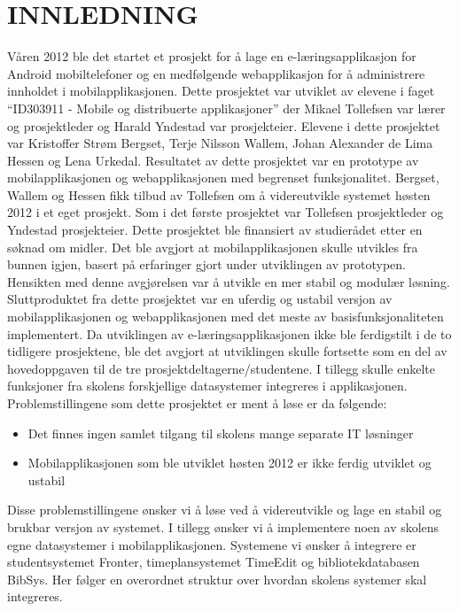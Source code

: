 \documentclass[../main.tex]{subfiles}
\begin{document}
\section{INNLEDNING}

Våren 2012 ble det startet et prosjekt for å lage en e-læringsapplikasjon for Android mobiltelefoner og en medfølgende webapplikasjon for å administrere innholdet i mobilapplikasjonen. Dette prosjektet var utviklet av elevene i faget “ID303911 - Mobile og distribuerte applikasjoner” der Mikael Tollefsen var lærer og prosjektleder og Harald Yndestad var prosjekteier. Elevene i dette prosjektet var Kristoffer Strøm Bergset, Terje Nilsson Wallem, Johan Alexander de Lima Hessen og Lena Urkedal. Resultatet av dette prosjektet var en prototype av mobilapplikasjonen og webapplikasjonen med begrenset funksjonalitet.\newline
\newline
Bergset, Wallem og Hessen fikk tilbud av Tollefsen om å videreutvikle systemet høsten 2012 i et eget prosjekt. Som i det første prosjektet var Tollefsen prosjektleder og Yndestad prosjekteier. Dette prosjektet ble finansiert av studierådet etter en søknad om midler. Det ble avgjort at mobilapplikasjonen skulle utvikles fra bunnen igjen, basert på erfaringer gjort under utviklingen av prototypen. Hensikten med denne avgjørelsen var å utvikle en mer stabil og modulær løsning. Sluttproduktet fra dette prosjektet var en uferdig og ustabil versjon av mobilapplikasjonen og webapplikasjonen med det meste av basisfunksjonaliteten implementert.\newline
\newline
Da utviklingen av e-læringsapplikasjonen ikke ble ferdigstilt i de to tidligere prosjektene, ble det avgjort at utviklingen skulle fortsette som en del av hovedoppgaven til de tre prosjektdeltagerne/studentene. I tillegg skulle enkelte funksjoner fra skolens forskjellige datasystemer integreres i applikasjonen.\newline
Problemstillingene som dette prosjektet er ment å løse er da følgende:
\begin{itemize}
\item Det finnes ingen samlet tilgang til skolens mange separate IT løsninger
\item Mobilapplikasjonen som ble utviklet høsten 2012 er ikke ferdig utviklet og ustabil
\end{itemize}
Disse problemstillingene ønsker vi å løse ved å videreutvikle og lage en stabil og brukbar versjon av systemet. I tillegg ønsker vi å implementere noen av skolens egne datasystemer i mobilapplikasjonen. Systemene vi ønsker å integrere er studentsystemet Fronter, timeplansystemet TimeEdit og bibliotekdatabasen BibSys. Her følger en overordnet struktur over hvordan skolens systemer skal integreres.
\end{document}
